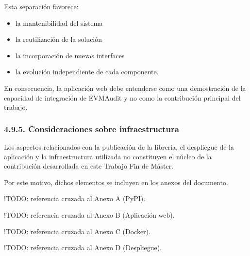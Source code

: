 Esta separación favorece:

\begin{itemize}
\tightlist
\item
  la mantenibilidad del sistema
\item
  la reutilización de la solución
\item
  la incorporación de nuevas interfaces
\item
  la evolución independiente de cada componente.
\end{itemize}

En consecuencia, la aplicación web debe entenderse como una demostración
de la capacidad de integración de EVMAudit y no como la contribución
principal del trabajo.

\subsubsection{4.9.5. Consideraciones sobre
infraestructura}\label{consideraciones-sobre-infraestructura}

Los aspectos relacionados con la publicación de la librería, el
despliegue de la aplicación y la infraestructura utilizada no
constituyen el núcleo de la contribución desarrollada en este Trabajo
Fin de Máster.

Por este motivo, dichos elementos se incluyen en los anexos del
documento.

!TODO: referencia cruzada al Anexo A (PyPI).

!TODO: referencia cruzada al Anexo B (Aplicación web).

!TODO: referencia cruzada al Anexo C (Docker).

!TODO: referencia cruzada al Anexo D (Despliegue).
